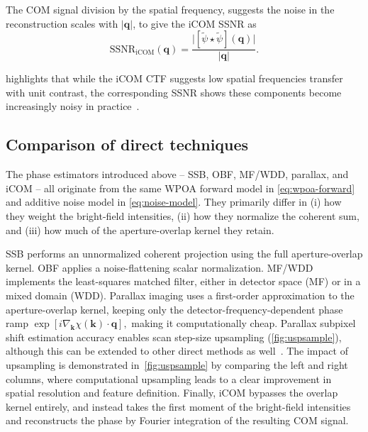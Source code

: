 \documentclass[pdflatex,sn-aps,iicol]{sn-jnl}%
\begin{document}
The COM signal division by the spatial frequency, suggests the noise in the reconstruction scales with $\lvert\boldsymbol{q}\rvert$, to give the iCOM SSNR as~\cite{Varnavides_2025_ssnr}
\begin{equation}
\mathrm{SSNR}_{\text{iCOM}}(\boldsymbol{q})
=
\frac{\lvert [\tilde{\psi}\star\tilde{\psi}](\boldsymbol{q}) \rvert}
{\lvert \boldsymbol{q} \rvert}.
\label{eq:icom-ssnr}
\end{equation}

 highlights that while the iCOM CTF suggests low spatial frequencies transfer with unit contrast, the corresponding SSNR shows these components become increasingly noisy in practice~\cite{Varnavides_2023,Yu_2025,Varnavides_2025_ssnr}.

\subsection*{Comparison of direct techniques}

The phase estimators introduced above -- SSB, OBF, MF/WDD, parallax, and iCOM -- all originate from the same WPOA forward model in \cref{eq:wpoa-forward} and additive noise model in \cref{eq:noise-model}.
They primarily differ in (i) how they weight the bright-field intensities, (ii) how they normalize the coherent sum, and (iii) how much of the aperture-overlap kernel they retain.

SSB performs an unnormalized coherent projection using the full aperture-overlap kernel.
OBF applies a noise-flattening scalar normalization.
MF/WDD implements the least-squares matched filter, either in detector space (MF) or in a mixed domain (WDD).
Parallax imaging uses a first-order approximation to the aperture-overlap kernel, keeping only the detector-frequency-dependent phase ramp
\(
\exp\!\left[i \nabla_{\boldsymbol{k}}\chi(\boldsymbol{k}) \cdot \boldsymbol{q}\right],
\)
making it computationally cheap.
Parallax subpixel shift estimation accuracy enables scan step-size upsampling (\cref{fig:uspsample}), although this can be extended to other direct methods as well~\cite{Varnavides_2025}.
The impact of upsampling is demonstrated in~\cref{fig:uspsample} by comparing the left and right columns, where computational upsampling leads to a clear improvement in spatial resolution and feature definition. 
Finally, iCOM bypasses the overlap kernel entirely, and instead takes the first moment of the bright-field intensities and reconstructs the phase by Fourier integration of the resulting COM signal.
\end{document}
